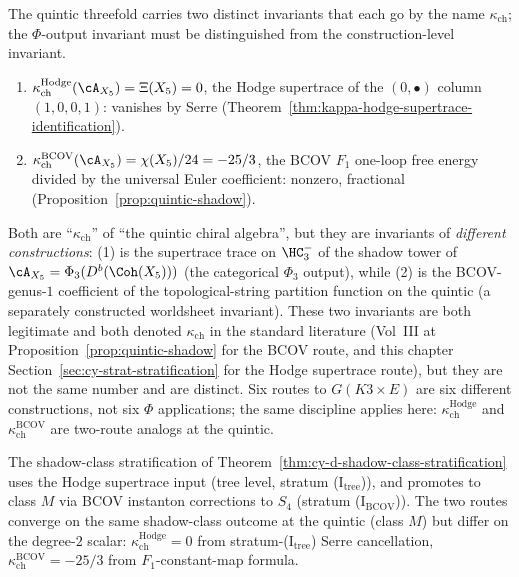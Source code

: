 \begin{remark}
\label{rem:kappa-ch-quintic-two-views}
The quintic threefold carries two distinct invariants that each go by
the name $\kappa_{\mathrm{ch}}$; the $\Phi$-output
invariant must be distinguished from the construction-level
invariant.
\begin{enumerate}
 \item $\kappa_{\mathrm{ch}}^{\mathrm{Hodge}}(\cA_{X_5}) = \Xi(X_5) = 0$,
 the Hodge supertrace of the $(0, \bullet)$ column
 $(1, 0, 0, 1)$: vanishes by Serre
 (Theorem~\ref{thm:kappa-hodge-supertrace-identification}).
 \item $\kappa_{\mathrm{ch}}^{\mathrm{BCOV}}(\cA_{X_5}) = \chi(X_5) / 24 = -25/3$,
 the BCOV $F_1$ one-loop free energy divided by the universal
 Euler coefficient: nonzero, fractional
 (Proposition~\ref{prop:quintic-shadow}).
\end{enumerate}
Both are ``$\kappa_{\mathrm{ch}}$'' of ``the quintic chiral algebra'',
but they are invariants of \emph{different constructions}:
(1) is the supertrace trace on $\HC^-_3$ of the shadow tower of
$\cA_{X_5} = \Phi_3(D^b(\Coh(X_5)))$ (the categorical $\Phi_3$ output),
while (2) is the BCOV-genus-$1$ coefficient of the topological-string
partition function on the quintic (a separately constructed worldsheet
invariant). These two invariants are both legitimate and both denoted
$\kappa_{\mathrm{ch}}$ in the standard literature (Vol~III
\cite{VolI} at
Proposition~\ref{prop:quintic-shadow} for the BCOV route, and this
chapter Section~\ref{sec:cy-strat-stratification} for the Hodge
supertrace route), but they are not the same number and are distinct.
Six routes to $G(K3 \times E)$ are six different
constructions, not six $\Phi$ applications; the same discipline applies here:
$\kappa_{\mathrm{ch}}^{\mathrm{Hodge}}$ and $\kappa_{\mathrm{ch}}^{\mathrm{BCOV}}$
are two-route analogs at the quintic.

The shadow-class stratification of
Theorem~\ref{thm:cy-d-shadow-class-stratification} uses the Hodge
supertrace input \textup{(}tree level, stratum (I$_{\mathrm{tree}}$)\textup{),}
and promotes to class $M$ via BCOV instanton corrections to $S_4$
\textup{(}stratum (I$_{\mathrm{BCOV}}$)\textup{).} The two routes
converge on the same shadow-class outcome at the quintic
\textup{(}class $M$\textup{)} but differ on the degree-$2$ scalar:
$\kappa_{\mathrm{ch}}^{\mathrm{Hodge}} = 0$ from stratum-(I$_{\mathrm{tree}}$)
Serre cancellation, $\kappa_{\mathrm{ch}}^{\mathrm{BCOV}} = -25/3$ from
$F_1$-constant-map formula.
\end{remark}

